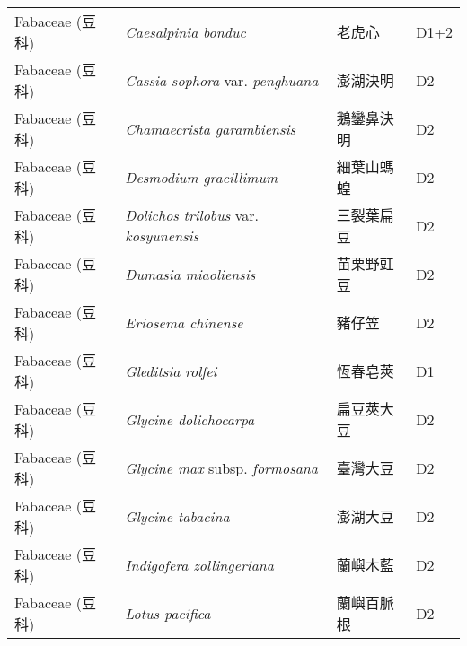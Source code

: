 \begin{longtable}{p{3cm}p{5cm}p{3cm}p{4cm}}
    Fabaceae (豆科) & \textit{Caesalpinia bonduc}  & 老虎心 & D1+2 \index{Caesalpinia@\textit{Caesalpinia}!bonduc@\textit{bonduc}}  \index{老虎心} \\
    Fabaceae (豆科) & \textit{Cassia sophora} var. \textit{penghuana}  & 澎湖決明 & D2 \index{Cassia@\textit{Cassia}!sophora@\textit{sophora}!var. penghuana@var. \textit{penghuana}}  \index{澎湖決明} \\
    Fabaceae (豆科) & \textit{Chamaecrista garambiensis}  & 鵝鑾鼻決明 & D2 \index{Chamaecrista@\textit{Chamaecrista}!garambiensis@\textit{garambiensis}}  \index{鵝鑾鼻決明} \\
    Fabaceae (豆科) & \textit{Desmodium gracillimum}  & 細葉山螞蝗 & D2 \index{Desmodium@\textit{Desmodium}!gracillimum@\textit{gracillimum}}  \index{細葉山螞蝗} \\
    Fabaceae (豆科) & \textit{Dolichos trilobus} var. \textit{kosyunensis}  & 三裂葉扁豆 & D2 \index{Dolichos@\textit{Dolichos}!trilobus@\textit{trilobus}!var. kosyunensis@var. \textit{kosyunensis}}  \index{三裂葉扁豆} \\
    Fabaceae (豆科) & \textit{Dumasia miaoliensis}  & 苗栗野豇豆 & D2 \index{Dumasia@\textit{Dumasia}!miaoliensis@\textit{miaoliensis}}  \index{苗栗野豇豆} \\
    Fabaceae (豆科) & \textit{Eriosema chinense}  & 豬仔笠 & D2 \index{Eriosema@\textit{Eriosema}!chinense@\textit{chinense}}  \index{豬仔笠} \\
    Fabaceae (豆科) & \textit{Gleditsia rolfei}  & 恆春皂莢 & D1 \index{Gleditsia@\textit{Gleditsia}!rolfei@\textit{rolfei}}  \index{恆春皂莢} \\
    Fabaceae (豆科) & \textit{Glycine dolichocarpa}  & 扁豆莢大豆 & D2 \index{Glycine@\textit{Glycine}!dolichocarpa@\textit{dolichocarpa}}  \index{扁豆莢大豆} \\
    Fabaceae (豆科) & \textit{Glycine max} subsp. \textit{formosana}  & 臺灣大豆 & D2 \index{Glycine@\textit{Glycine}!max@\textit{max}!subsp. formosana@subsp. \textit{formosana}}  \index{臺灣大豆} \\
    Fabaceae (豆科) & \textit{Glycine tabacina}  & 澎湖大豆 & D2 \index{Glycine@\textit{Glycine}!tabacina@\textit{tabacina}}  \index{澎湖大豆} \\
    Fabaceae (豆科) & \textit{Indigofera zollingeriana}  & 蘭嶼木藍 & D2 \index{Indigofera@\textit{Indigofera}!zollingeriana@\textit{zollingeriana}}  \index{蘭嶼木藍} \\
    Fabaceae (豆科) & \textit{Lotus pacifica}  & 蘭嶼百脈根 & D2 \index{Lotus@\textit{Lotus}!pacifica@\textit{pacifica}}  \index{蘭嶼百脈根} \\

\end{longtable}
